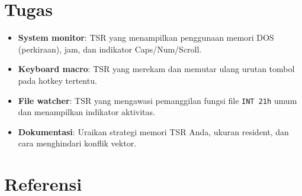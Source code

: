 \section{Tugas}
\begin{itemize}
  \item \textbf{System monitor}: TSR yang menampilkan penggunaan memori DOS (perkiraan), jam, dan indikator Caps/Num/Scroll.
  \item \textbf{Keyboard macro}: TSR yang merekam dan memutar ulang urutan tombol pada hotkey tertentu.
  \item \textbf{File watcher}: TSR yang mengawasi pemanggilan fungsi file \texttt{INT 21h} umum dan menampilkan indikator aktivitas.
  \item \textbf{Dokumentasi}: Uraikan strategi memori TSR Anda, ukuran resident, dan cara menghindari konflik vektor.
\end{itemize}

\section{Referensi}
